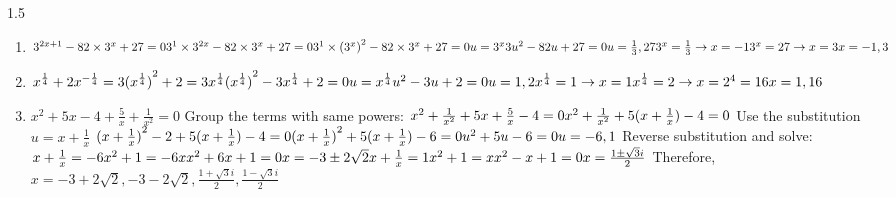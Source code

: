 \documentclass[../main.tex]{subfiles}
\begin{document}
\begin{spacing}{1.5}
\begin{enumerate}
    \item
    \(
    3^{2x+1} - 82\times 3^{x} +27 = 0\\
    3^{1}\times 3^{2x} - 82\times 3^{x} +27 = 0\\
    3^{1}\times {(3^{x})}^2 - 82\times 3^{x} +27 = 0\\
    u = 3^{x}\\
    3u^{2} - 82u + 27 = 0\\
    u = \frac{1}{3}, 27\\
    3^{x} = \frac{1}{3} \rightarrow x = -1\\
    3^{x} = 27 \rightarrow x = 3
    x = -1, 3
    \)

    \item 
    \(
    x^{\frac{1}{4}} +2x^{-\frac{1}{4}}=3\\
    {(x^{\frac{1}{4}})}^2 + 2 = 3x^{\frac{1}{4}}\\
    {(x^{\frac{1}{4}})}^2 - 3x^{\frac{1}{4}} + 2 = 0\\
    u = x^{\frac{1}{4}}\\
    u^2 - 3u + 2 = 0\\
    u = 1, 2\\
    x^{\frac{1}{4}} = 1 \rightarrow x = 1\\
    x^{\frac{1}{4}} = 2 \rightarrow x = 2^4 = 16\\
    x = 1, 16
    \)

    \item 
    \(x^2 + 5x - 4 + \frac{5}{x} + \frac{1}{x^2} = 0\)
    Group the terms with same powers:
    \(
    x^2 + \frac{1}{x^2} + 5x + \frac{5}{x} -4 = 0\\
    x^2 + \frac{1}{x^2} + 5(x + \frac{1}{x}) - 4 = 0
    \)
    Use the substitution \(u = x + \frac{1}{x}\)
    \(
    {(x + \frac{1}{x})}^2 - 2 + 5(x + \frac{1}{x}) - 4 = 0\\
    {(x + \frac{1}{x})}^2 + 5(x + \frac{1}{x}) - 6 = 0\\
    u^2 + 5u - 6 = 0\\
    u = -6, 1
    \)
    Reverse substitution and solve:\\
    \(
    x + \frac{1}{x} = -6\\
    x^2 + 1 = -6x\\
    x^2 + 6x + 1 = 0\\
    x = -3 \pm 2\sqrt{2}\\
    x + \frac{1}{x} = 1\\
    x^2 + 1 = x\\
    x^2 - x + 1 = 0\\
    x = \frac{1 \pm \sqrt{3}i}{2}
    \)
    Therefore, \(x = -3 + 2\sqrt{2}, -3 - 2\sqrt{2}, \frac{1 + \sqrt{3}i}{2}, \frac{1 - \sqrt{3}i}{2}\)


\end{enumerate}
\end{spacing}
\end{document}
